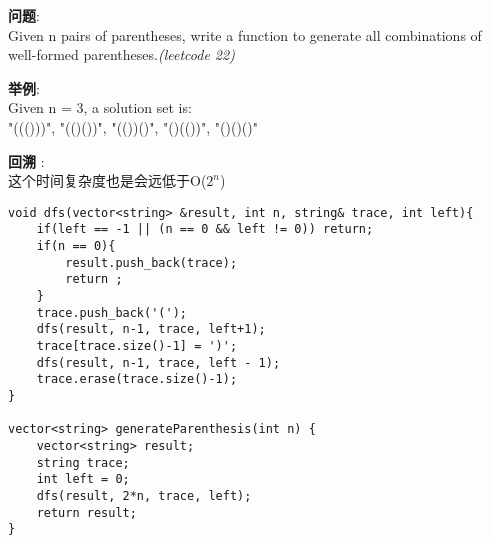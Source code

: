     
\begin{description}
    \item{\textbf{问题}}:\\
Given n pairs of parentheses, write a function to generate all combinations of well-formed parentheses.\textit{(leetcode 22)}
	\item{\textbf{举例}}:\\
Given n = 3, a solution set is:\\
"((()))", "(()())", "(())()", "()(())", "()()()"
    \item{\textbf{回溯}} : 
    \\这个时间复杂度也是会远低于O($2^n$)
    \begin{lstlisting}
void dfs(vector<string> &result, int n, string& trace, int left){
	if(left == -1 || (n == 0 && left != 0))	return;
	if(n == 0){
		result.push_back(trace);
		return ;
	}
	trace.push_back('(');
	dfs(result, n-1, trace, left+1);
	trace[trace.size()-1] = ')';
	dfs(result, n-1, trace, left - 1);
	trace.erase(trace.size()-1);
}

vector<string> generateParenthesis(int n) {
	vector<string> result;
	string trace;
	int left = 0;
	dfs(result, 2*n, trace, left);
	return result;
}
    \end{lstlisting}
\end{description}
